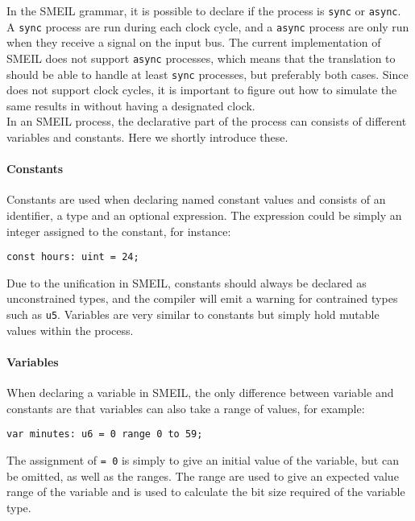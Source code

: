 In the SMEIL grammar, it is possible to declare if the process is \texttt{sync} or \texttt{async}. A \texttt{sync} process are run during each clock cycle, and a \texttt{async} process are only run when they receive a signal on the input bus. The current implementation of SMEIL does not support \texttt{async} processes, which means that the translation to \cspm should be able to handle at least \texttt{sync} processes, but preferably both cases. Since \cspm does not support clock cycles, it is important to figure out how to simulate the same results in \cspm without having a designated clock.
\\

In an SMEIL process, the declarative part of the process can consists of different variables and constants. Here we shortly introduce these.
\paragraph{Constants}
Constants are used when declaring named constant values and consists of an identifier, a type and an optional expression. The expression could be simply an integer assigned to the constant, for instance:
\begin{verbatim}
const hours: uint = 24;
\end{verbatim}
Due to the unification in SMEIL, constants should always be declared as unconstrained types, and the compiler will emit a warning for contrained types such as \texttt{u5}. %
Variables are very similar to constants but simply hold mutable values within the process. %
\paragraph{Variables}
When declaring a variable in SMEIL, the only difference between variable and constants are that variables can also take a range of values, for example:
\begin{verbatim}
var minutes: u6 = 0 range 0 to 59;
\end{verbatim}
The assignment of \texttt{= 0} is simply to give an initial value of the variable, but can be omitted, as well as the ranges. The range are used to give an expected value range of the variable and is used to calculate the bit size required of the variable type.

